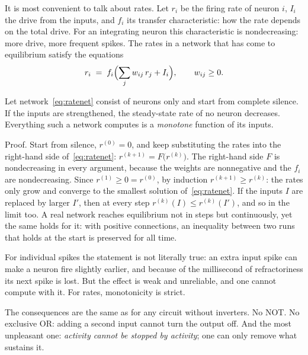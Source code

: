 It is most convenient to talk about rates. Let $r_i$ be the firing rate of neuron $i$, $I_i$ the drive from the inputs, and $f_i$ its transfer characteristic: how the rate depends on the total drive. For an integrating neuron this characteristic is nondecreasing: more drive, more frequent spikes. The rates in a network that has come to equilibrium satisfy the equations
\begin{equation}
r_i \;=\; f_i\Bigl(\sum_j w_{ij}\,r_j + I_i\Bigr), \qquad w_{ij}\ge 0 .
\label{eq:ratenet}
\end{equation}

\begin{keyblock}
\begin{proposition}[Monotonicity]
\label{prop:monotone}
Let network~\eqref{eq:ratenet} consist of  neurons only and start from complete silence. If the inputs are strengthened, the steady-state rate of no neuron decreases. Everything such a network computes is a \emph{monotone} function of its inputs.
\end{proposition}
\end{keyblock}

Proof. Start from silence, $r^{(0)}=0$, and keep substituting the rates into the right-hand side of~\eqref{eq:ratenet}: $r^{(k+1)}=F\bigl(r^{(k)}\bigr)$. The right-hand side $F$ is nondecreasing in every argument, because the weights are nonnegative and the $f_i$ are nondecreasing. Since $r^{(1)}\ge0=r^{(0)}$, by induction $r^{(k+1)}\ge r^{(k)}$: the rates only grow and converge to the smallest solution of~\eqref{eq:ratenet}. If the inputs $I$ are replaced by larger $I'$, then at every step $r^{(k)}(I)\le r^{(k)}(I')$, and so in the limit too. A real network reaches equilibrium not in steps but continuously, yet the same holds for it: with positive connections, an inequality between two runs that holds at the start is preserved for all time.

For individual spikes the statement is not literally true: an extra input spike can make a neuron fire slightly earlier, and because of the millisecond of refractoriness its next spike is lost. But the effect is weak and unreliable, and one cannot compute with it. For rates, monotonicity is strict.

The consequences are the same as for any circuit without inverters. No NOT. No exclusive OR: adding a second input cannot turn the output off. And the most unpleasant one: \emph{activity cannot be stopped by activity}; one can only remove what sustains it.

